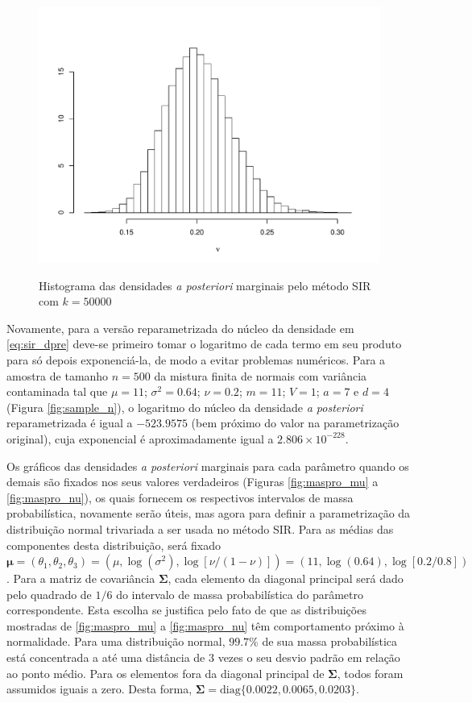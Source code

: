 \begin{figure}[t]
{{			\includegraphics[scale=0.4]{figuras/nu_sir_50000.pdf}}}%
	\caption{Histograma das densidades \textit{a posteriori} marginais pelo método SIR com $k = 50000$}%
\end{figure}

Novamente, para a versão reparametrizada do núcleo da densidade em \eqref{eq:sir_dpre} deve-se primeiro tomar o logaritmo de cada termo em seu produto para só depois exponenciá-la, de modo a evitar problemas numéricos. Para a amostra de tamanho $n=500$ da mistura finita de normais com variância contaminada tal que $\mu = 11$; $\sigma^2 = 0.64$; $\nu = 0.2$; $m = 11$; $V = 1$; $a = 7$ e $d = 4$ (Figura \ref{fig:sample_n}), o logaritmo do núcleo da densidade \textit{a posteriori} reparametrizada é igual a $-523.9575$ (bem próximo do valor na parametrização original), cuja exponencial é aproximadamente igual a $2.806 \times 10^{-228}$.

Os gráficos das densidades \textit{a posteriori} marginais para cada parâmetro quando os demais são fixados nos seus valores verdadeiros (Figuras \ref{fig:maspro_mu} a \ref{fig:maspro_nu}), os quais fornecem os respectivos intervalos de massa probabilística, novamente serão úteis, mas agora para definir a parametrização da distribuição normal trivariada a ser usada no método SIR. Para as médias das componentes desta distribuição, será fixado $\bm{\mu} = (\theta_1, \theta_2, \theta_3) = (\mu, \log(\sigma^2), \log[\nu/(1-\nu)]) = (11, \log(0.64), \log[0.2/0.8])$. Para a matriz de covariância $\bm{\Sigma}$, cada elemento da diagonal principal será dado pelo quadrado de $1/6$ do intervalo de massa probabilística do parâmetro correspondente. Esta escolha se justifica pelo fato de que as distribuições mostradas de \ref{fig:maspro_mu} a \ref{fig:maspro_nu} têm comportamento próximo à normalidade. Para uma distribuição normal, $99.7\%$ de sua massa probabilística está concentrada a até uma distância de 3 vezes o seu desvio padrão em relação ao ponto médio. Para os elementos fora da diagonal principal de $\bm{\Sigma}$, todos foram assumidos iguais a zero. Desta forma, $\bm{\Sigma} = \textrm{diag}\{0.0022, 0.0065, 0.0203\}$.

